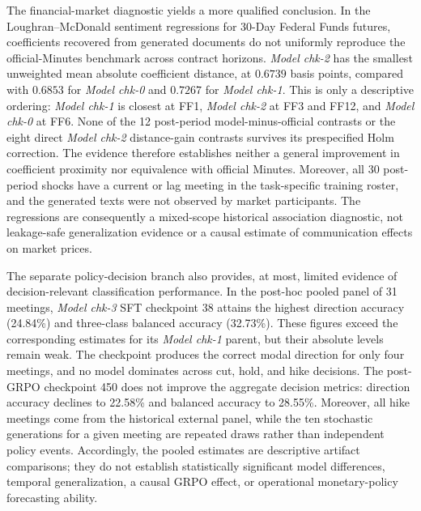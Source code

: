 The financial-market diagnostic yields a more qualified conclusion. In the
Loughran--McDonald sentiment regressions for 30-Day Federal Funds futures,
coefficients recovered from generated documents do not uniformly reproduce the
official-Minutes benchmark across contract horizons. \textit{Model chk-2} has
the smallest unweighted mean absolute coefficient distance, at \(0.6739\) basis
points, compared with \(0.6853\) for \textit{Model chk-0} and \(0.7267\) for
\textit{Model chk-1}. This is only a descriptive ordering: \textit{Model chk-1}
is closest at FF1, \textit{Model chk-2} at FF3 and FF12, and \textit{Model
chk-0} at FF6. None of the 12 post-period model-minus-official contrasts or the
eight direct \textit{Model chk-2} distance-gain contrasts survives its
prespecified Holm correction. The evidence therefore establishes neither a
general improvement in coefficient proximity nor equivalence with official
Minutes. Moreover, all 30 post-period shocks have a current or lag meeting in
the task-specific training roster, and the generated texts were not observed
by market participants. The regressions are consequently a mixed-scope
historical association diagnostic, not leakage-safe generalization evidence or
a causal estimate of communication effects on market prices.

The separate policy-decision branch also provides, at most, limited evidence of
decision-relevant classification performance. In the post-hoc pooled panel of
31 meetings, \textit{Model chk-3} SFT checkpoint 38 attains the highest
direction accuracy (24.84\%) and three-class balanced accuracy (32.73\%). These
figures exceed the corresponding estimates for its \textit{Model chk-1}
parent, but their absolute levels remain weak. The checkpoint produces the
correct modal direction for only four meetings, and no model dominates across
cut, hold, and hike decisions. The post-GRPO checkpoint 450 does not improve the
aggregate decision metrics: direction accuracy declines to 22.58\% and
balanced accuracy to 28.55\%. Moreover, all hike meetings come from the
historical external panel, while the ten stochastic generations for a given
meeting are repeated draws rather than independent policy events. Accordingly,
the pooled estimates are descriptive artifact comparisons; they do not
establish statistically significant model differences, temporal
generalization, a causal GRPO effect, or operational monetary-policy forecasting
ability.

